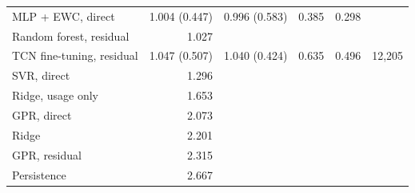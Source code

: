 \begin{table}[t]
\begin{tabular}{lrrrrr}
    MLP + EWC, direct & 1.004 (0.447) & 0.996 (0.583) & 0.385 & 0.298 &  \\
    Random forest, residual & 1.027 &  &  &  &  \\
    TCN fine-tuning, residual & 1.047 (0.507) & 1.040 (0.424) & 0.635 & 0.496 & 12,205 \\
    SVR, direct & 1.296 &  &  &  &  \\
    Ridge, usage only & 1.653 &  &  &  &  \\
    GPR, direct & 2.073 &  &  &  &  \\
    Ridge & 2.201 &  &  &  &  \\
    GPR, residual & 2.315 &  &  &  &  \\
    Persistence & 2.667 &  &  &  &  \\
    \bottomrule
  \end{tabular}
\end{table}
